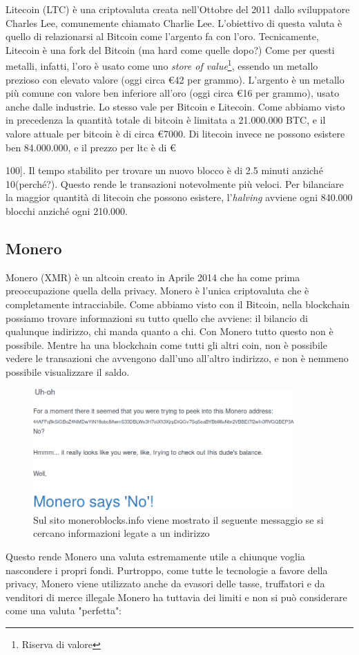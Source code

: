 \documentclass {article}
\begin{document}
Litecoin (LTC) è una criptovaluta creata nell'Ottobre del 2011 dallo sviluppatore Charles Lee, comunemente chiamato Charlie Lee. L'obiettivo di questa valuta è quello di relazionarsi al Bitcoin come l'argento fa con l'oro.
Tecnicamente, Litecoin è una fork del Bitcoin (ma hard come quelle dopo?)
Come per questi metalli, infatti, l'oro è usato come uno \textit{store of value}\footnote{Riserva di valore}, essendo un metallo prezioso con elevato valore (oggi circa \euro{42} per grammo). L'argento è un metallo più comune con valore ben inferiore all'oro (oggi circa \euro{16} per grammo), usato anche dalle industrie.
Lo stesso vale per Bitcoin e Litecoin. Come abbiamo visto in precedenza la quantità totale di bitcoin è limitata a 21.000.000 BTC, e il valore attuale per bitcoin è di circa \euro{7000}.
Di litecoin invece ne possono esistere ben 84.000.000, e il prezzo per ltc è di \euro{100].
Il tempo stabilito per trovare un nuovo blocco è di 2.5 minuti anziché 10(perché?). Questo rende le transazioni notevolmente più veloci.
Per bilanciare la maggior quantità di litecoin che possono esistere, l'\textit{halving} avviene ogni 840.000 blocchi anziché ogni 210.000.


\subsection {Monero}


Monero (XMR) è un altcoin creato in Aprile 2014 che ha come prima preoccupazione quella della privacy.
Monero è l'unica criptovaluta che è completamente intracciabile. Come abbiamo visto con il Bitcoin, nella blockchain possiamo trovare informazioni su tutto quello che avviene: il bilancio di qualunque indirizzo, chi manda quanto a chi.
Con Monero tutto questo non è possibile. Mentre ha una blockchain come tutti gli altri coin, non è possibile vedere le transazioni che avvengono dall'uno all'altro indirizzo, e non è nemmeno possibile visualizzare il saldo.

\vspace {0.5cm}
\begin{figure}
\includegraphics [width = 10cm] {monero.png}
\centering
\caption {Sul sito moneroblocks.info viene mostrato il seguente messaggio se si cercano informazioni legate a un indirizzo}
\end{figure}
\vspace {0.2cm}
\noindent
%
Questo rende Monero una valuta estremamente utile a chiunque voglia nascondere i propri fondi.
Purtroppo, come tutte le tecnologie a favore della privacy, Monero viene utilizzato anche da evasori delle tasse, truffatori e da venditori di merce illegale
Monero ha tuttavia dei limiti e non si può considerare come una valuta "perfetta": 

}
\end{document}
